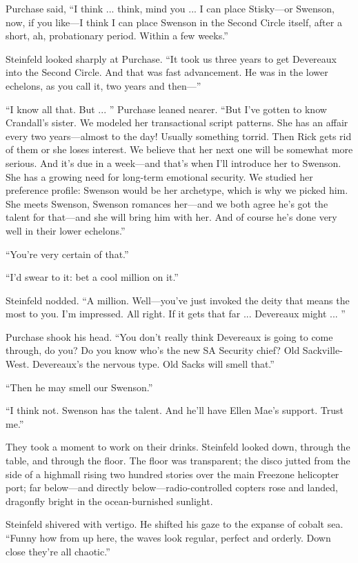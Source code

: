 Purchase said, ``I think ... think, mind you ... I can place Stisky—or Swenson, now, if you like—I think I can place Swenson in the Second Circle itself, after a short, ah, probationary period. Within a few weeks.''

Steinfeld looked sharply at Purchase. ``It took us three years to get Devereaux into the Second Circle. And that was fast advancement. He was in the lower echelons, as you call it, two years and then—''

``I know all that. But ... '' Purchase leaned nearer. ``But I've gotten to know Crandall's sister. We modeled her transactional script patterns. She has an affair every two years—almost to the day! Usually something torrid. Then Rick gets rid of them or she loses interest. We believe that her next one will be somewhat more serious. And it's due in a week—and that's when I'll introduce her to Swenson. She has a growing need for long-term emotional security. We studied her preference profile: Swenson would be her archetype, which is why we picked him. She meets Swenson, Swenson romances her—and we both agree he's got the talent for that—and she will bring him with her. And of course he's done very well in their lower echelons.''

``You're very certain of that.''

``I'd swear to it: bet a cool million on it.''

Steinfeld nodded. ``A million. Well—you've just invoked the deity that means the most to you. I'm impressed. All right. If it gets that far ... Devereaux might ... ''

Purchase shook his head. ``You don't really think Devereaux is going to come through, do you? Do you know who's the new SA Security chief? Old Sackville-West. Devereaux's the nervous type. Old Sacks will smell that.''

``Then he may smell our Swenson.''

``I think not. Swenson has the talent. And he'll have Ellen Mae's support. Trust me.''

They took a moment to work on their drinks. Steinfeld looked down, through the table, and through the floor. The floor was transparent; the disco jutted from the side of a highmall rising two hundred stories over the main Freezone helicopter port; far below—and directly below—radio-controlled copters rose and landed, dragonfly bright in the ocean-burnished sunlight.

Steinfeld shivered with vertigo. He shifted his gaze to the expanse of cobalt sea. ``Funny how from up here, the waves look regular, perfect and orderly. Down close they're all chaotic.''

